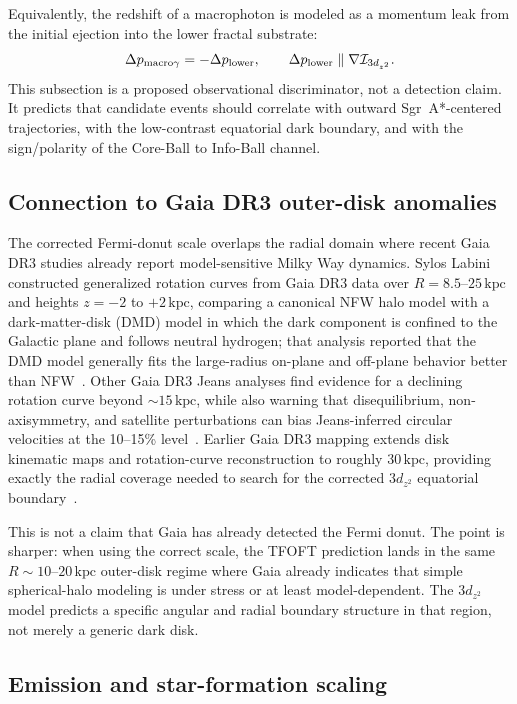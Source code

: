 \documentclass[11pt,a4paper]{article}
\newcommand{\kpc}{\mathrm{kpc}}
\begin{document}
Equivalently, the redshift of a macrophoton is modeled as a momentum leak from
the initial ejection into the lower fractal substrate:
\begin{equation}
  \Delta p_{\rm macro\gamma}
  =
  -\Delta p_{\rm lower},
  \qquad
  \Delta p_{\rm lower}
  \parallel
  \nabla\mathcal I_{3d_{z^2}}.
  \label{eq:macrophoton_leak}
\end{equation}
This subsection is a proposed observational discriminator, not a detection
claim.  It predicts that candidate events should correlate with outward
Sgr~A*-centered trajectories, with the low-contrast equatorial dark boundary,
and with the sign/polarity of the Core-Ball to Info-Ball channel.

\subsection{Connection to Gaia DR3 outer-disk anomalies}

The corrected Fermi-donut scale overlaps the radial domain where recent Gaia
DR3 studies already report model-sensitive Milky Way dynamics. Sylos Labini
constructed generalized rotation curves from Gaia DR3 data over
$R=8.5$--$25\,\kpc$ and heights $z=-2$ to $+2\,\kpc$, comparing a canonical
NFW halo model with a dark-matter-disk (DMD) model in which the dark component
is confined to the Galactic plane and follows neutral hydrogen; that analysis
reported that the DMD model generally fits the large-radius on-plane and
off-plane behavior better than NFW~\cite{SylosLabini2024}. Other Gaia DR3
Jeans analyses find evidence for a declining rotation curve beyond
$\sim15\,\kpc$, while also warning that disequilibrium, non-axisymmetry, and
satellite perturbations can bias Jeans-inferred circular velocities at the
10--15\% level~\cite{Koop2024}. Earlier Gaia DR3 mapping extends disk
kinematic maps and rotation-curve reconstruction to roughly $30\,\kpc$,
providing exactly the radial coverage needed to search for the corrected
$3d_{z^2}$ equatorial boundary~\cite{Wang2023}.

This is not a claim that Gaia has already detected the Fermi donut. The point
is sharper: when using the correct scale, the TFOFT
prediction lands in the same $R\sim10$--$20\,\kpc$ outer-disk regime where
Gaia already indicates that simple spherical-halo modeling is under stress or
at least model-dependent. The $3d_{z^2}$ model predicts a specific angular and
radial boundary structure in that region, not merely a generic dark disk.

\subsection{Emission and star-formation scaling}
\end{document}
